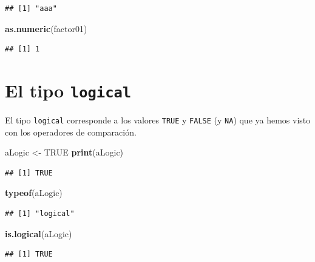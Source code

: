 \documentclass[]{book}
\newenvironment{Shaded}{\begin{snugshade}}{\end{snugshade}}
\newcommand{\KeywordTok}[1]{\textcolor[rgb]{0.13,0.29,0.53}{\textbf{#1}}}
\newcommand{\StringTok}[1]{\textcolor[rgb]{0.31,0.60,0.02}{#1}}
\newcommand{\OtherTok}[1]{\textcolor[rgb]{0.56,0.35,0.01}{#1}}
\newcommand{\NormalTok}[1]{#1}
\begin{document}
\begin{verbatim}
## [1] "aaa"
\end{verbatim}

\begin{Shaded}
\begin{Highlighting}[]
\KeywordTok{as.numeric}\NormalTok{(factor01)}
\end{Highlighting}
\end{Shaded}

\begin{verbatim}
## [1] 1
\end{verbatim}

\section{\texorpdfstring{El tipo
\texttt{logical}}{El tipo logical}}\label{el-tipo-logical}

El tipo \texttt{logical} corresponde a los valores \texttt{TRUE} y
\texttt{FALSE} (y \texttt{NA}) que ya hemos visto con los operadores de
comparación.

\begin{Shaded}
\begin{Highlighting}[]
\NormalTok{aLogic <-}\StringTok{ }\OtherTok{TRUE}
\KeywordTok{print}\NormalTok{(aLogic)}
\end{Highlighting}
\end{Shaded}

\begin{verbatim}
## [1] TRUE
\end{verbatim}

\begin{Shaded}
\begin{Highlighting}[]
\KeywordTok{typeof}\NormalTok{(aLogic)}
\end{Highlighting}
\end{Shaded}

\begin{verbatim}
## [1] "logical"
\end{verbatim}

\begin{Shaded}
\begin{Highlighting}[]
\KeywordTok{is.logical}\NormalTok{(aLogic)}
\end{Highlighting}
\end{Shaded}

\begin{verbatim}
## [1] TRUE
\end{verbatim}
\end{document}
